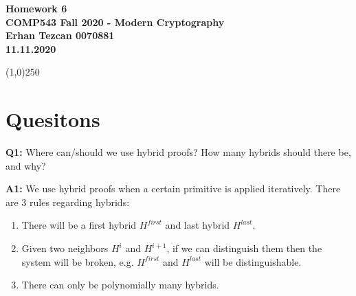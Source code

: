 \documentclass[12pt,reqno]{amsart}
\newcommand{\code}[1]{\texttt{#1}}
\begin{document}
\begin{center}
\large\textbf{Homework 6 \\ COMP543 Fall 2020 - Modern Cryptography \\}
\normalsize\textbf{ Erhan Tezcan 0070881 \\ 11.11.2020} \\
\end{center}

\begin{center}
\line(1,0){250}
\end{center}

%
%

%
%
\section{Quesitons}
\textbf{Q1:} Where can/should we use hybrid proofs? How many hybrids should there be, and why?

\textbf{A1:} We use hybrid proofs when a certain primitive is applied iteratively. There are 3 rules regarding hybrids:
\begin{enumerate}
	\item There will be a first hybrid $H^{first}$ and last hybrid $H^{last}$.
	\item Given two neighbors $H^i$ and $H^{i+1}$, if we can distinguish them then the system will be broken, e.g. $H^{first}$ and $H^{last}$ will be distinguishable.
	\item There can only be polynomially many hybrids.
\end{enumerate}
\end{document}
